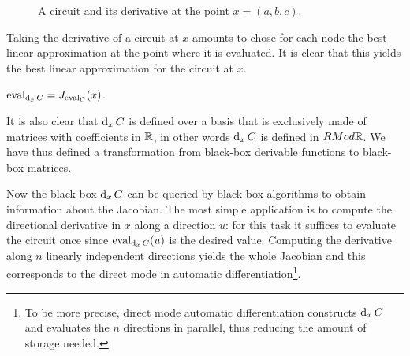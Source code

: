 \begin{figure}[!ht]
  \centering
  \caption{A circuit and its derivative at the point $x=(a,b,c)$.}
  \label{fig:derivative}
\end{figure}

Taking the derivative of a circuit at $x$ amounts to chose for each
node the best linear approximation at the point where it is
evaluated. It is clear that this yields the best linear approximation
for the circuit at $x$.

\begin{proposition}
  $\operatorname{eval}_{\operatorname{d}_xC}=J_{\operatorname{eval}_C}(x)$.
\end{proposition}

It is also clear that $\operatorname{d}_xC$ is defined over a basis that is
exclusively made of matrices with coefficients in $\mathbb{R}$, in other words
$\operatorname{d}_xC$ is defined in $RMod{\mathbb{R}}$. We have thus defined a
transformation from black-box derivable functions to black-box
matrices.

Now the black-box $\operatorname{d}_xC$ can be queried by black-box algorithms to
obtain information about the Jacobian. The most simple application is
to compute the directional derivative in $x$ along a direction $u$:
for this task it suffices to evaluate the circuit once since
$\operatorname{eval}_{\operatorname{d}_xC}(u)$ is the desired value. Computing the derivative
along $n$ linearly independent directions yields the whole Jacobian
and this corresponds to the direct mode in automatic
differentiation\footnote{To be more precise, direct mode automatic
  differentiation constructs $\operatorname{d}_xC$ and evaluates the $n$
  directions in parallel, thus reducing the amount of storage
  needed.}.

